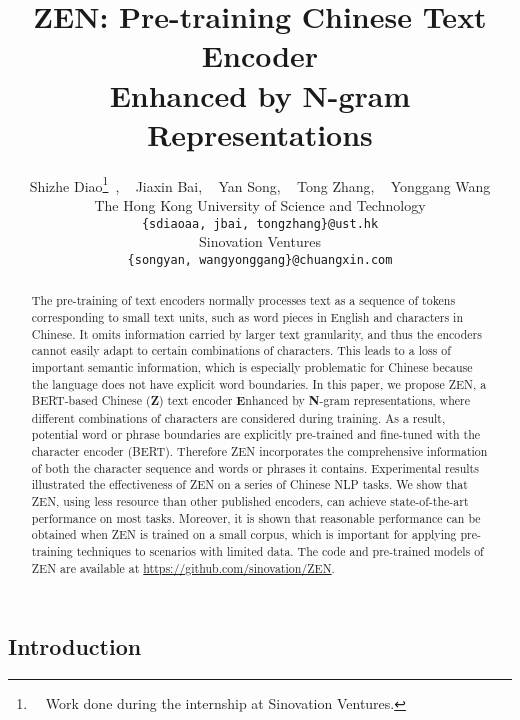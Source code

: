 \documentclass[11pt,a4paper]{article}
\title{ZEN: Pre-training Chinese Text Encoder\\ Enhanced by N-gram Representations}
\author{Shizhe Diao\thanks{~~Work done during the internship at Sinovation Ventures.}~, ~ Jiaxin Bai, ~ Yan Song, ~ Tong Zhang, ~ Yonggang Wang\\
  The Hong Kong University of Science and Technology\\
  \texttt{\{sdiaoaa, jbai, tongzhang\}@ust.hk}\\
  Sinovation Ventures\\
  \texttt{\{songyan, wangyonggang\}@chuangxin.com}
}
\date{}
\begin{document}
\begin{CJK}{UTF8}{gbsn}
\maketitle
\begin{abstract}
The pre-training of text encoders normally processes text as a sequence of tokens corresponding to small text units, such as word pieces in English and characters in Chinese. It omits information carried by larger text granularity, and thus
the encoders cannot easily adapt to certain combinations of characters. This leads to a loss of important semantic information, which is especially problematic for Chinese because the language does not have explicit word boundaries.
In this paper, we propose ZEN, a BERT-based Chinese (\textbf{Z}) text encoder \textbf{E}nhanced by \textbf{N}-gram representations,
where different combinations of characters are considered during  training.
As a result, potential word or phrase boundaries are explicitly pre-trained and fine-tuned with the character encoder (BERT).
Therefore ZEN incorporates the comprehensive information of both the character sequence and words or phrases it contains.
Experimental results illustrated the effectiveness of ZEN on a series of Chinese NLP tasks.
We show that ZEN, using less resource than other published encoders, can achieve state-of-the-art performance on most tasks.
Moreover, it is shown that reasonable performance can be obtained when ZEN is trained on a small corpus,
which is important for applying pre-training techniques to scenarios with limited data.
The code and pre-trained models of ZEN are available at \url{https://github.com/sinovation/ZEN}.



\end{abstract}

\section{Introduction}



\end{CJK}
\end{document}
